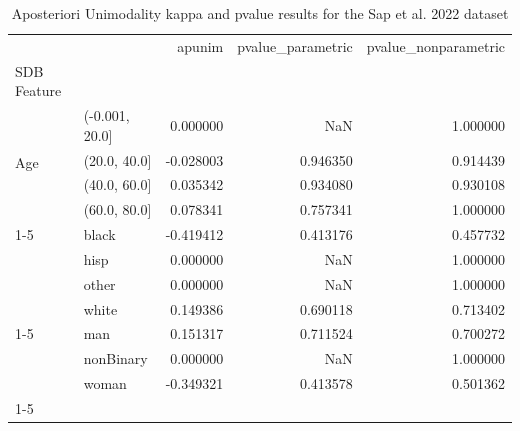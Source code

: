 \begin{table}
\caption{Aposteriori Unimodality kappa and pvalue results for the Sap et al. 2022 dataset}
\label{tab:results_sap}
\begin{tabular*}{\textwidth}{llrrr}
\toprule
 &  & apunim & pvalue\_parametric & pvalue\_nonparametric \\
SDB Feature &  &  &  &  \\
\midrule
\multirow[t]{4}{*}{Age} & (-0.001, 20.0] & 0.000000 & NaN & 1.000000 \\
 & (20.0, 40.0] & -0.028003 & 0.946350 & 0.914439 \\
 & (40.0, 60.0] & 0.035342 & 0.934080 & 0.930108 \\
 & (60.0, 80.0] & 0.078341 & 0.757341 & 1.000000 \\
\cline{1-5}
\multirow[t]{4}{*}{Ethnicity} & black & -0.419412 & 0.413176 & 0.457732 \\
 & hisp & 0.000000 & NaN & 1.000000 \\
 & other & 0.000000 & NaN & 1.000000 \\
 & white & 0.149386 & 0.690118 & 0.713402 \\
\cline{1-5}
\multirow[t]{3}{*}{Gender} & man & 0.151317 & 0.711524 & 0.700272 \\
 & nonBinary & 0.000000 & NaN & 1.000000 \\
 & woman & -0.349321 & 0.413578 & 0.501362 \\
\cline{1-5}
\bottomrule
\end{tabular*}
\end{table}
